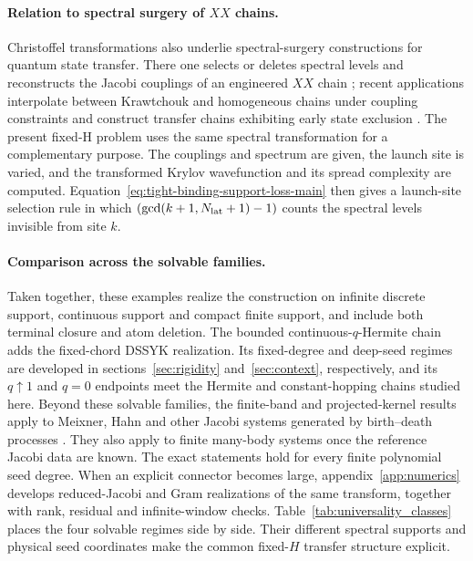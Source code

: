 \documentclass[a4paper,11pt]{article}
\theoremstyle{definition}
\theoremstyle{remark}
\begin{document}
\paragraph{Relation to spectral surgery of $XX$ chains.}
Christoffel transformations also underlie spectral-surgery constructions for quantum state
transfer.  There one selects or deletes spectral levels and reconstructs the Jacobi couplings of
an engineered $XX$ chain \cite{VinetZhedanov2012PST,VinetZhedanov2012Para}; recent applications
interpolate between Krawtchouk and homogeneous chains under coupling constraints and construct transfer chains exhibiting early state exclusion
\cite{VinetZhedanov2024Surgery,BaileyEtAl2024PST}.  The present fixed-H problem uses the same
spectral transformation for a complementary purpose.  The couplings and spectrum are given, the
launch site is varied, and the transformed Krylov wavefunction and its spread complexity are
computed.  Equation~\eqref{eq:tight-binding-support-loss-main} then gives a launch-site selection
rule in which $\left(\gcd(k+1,N_{\rm lat}+1)-1\right)$ counts the spectral levels invisible from site $k$.

\paragraph{Comparison across the solvable families.}
Taken together, these examples realize the construction on infinite discrete support, continuous support and compact finite support, and include both terminal closure and atom deletion.
The bounded continuous-$q$-Hermite chain adds the fixed-chord DSSYK realization.  Its
fixed-degree and deep-seed regimes are developed in sections~\ref{sec:rigidity}
and~\ref{sec:context}, respectively, and its $q\uparrow1$ and $q=0$ endpoints meet the Hermite and
constant-hopping chains studied here.
Beyond these solvable families, the finite-band and projected-kernel results apply to Meixner, Hahn and other Jacobi systems generated by birth--death processes \cite{KarlinMcGregor1957,DominguezBook}. They also apply to finite many-body systems once the reference Jacobi data are known. The exact statements hold for every finite polynomial seed degree. When an explicit connector becomes large, appendix~\ref{app:numerics} develops reduced-Jacobi and Gram realizations of the same transform, together with rank, residual and infinite-window checks.
Table~\ref{tab:universality_classes} places the four solvable regimes side by side.  Their
different spectral supports and physical seed coordinates make the common fixed-$H$ transfer
structure explicit.
\end{document}
